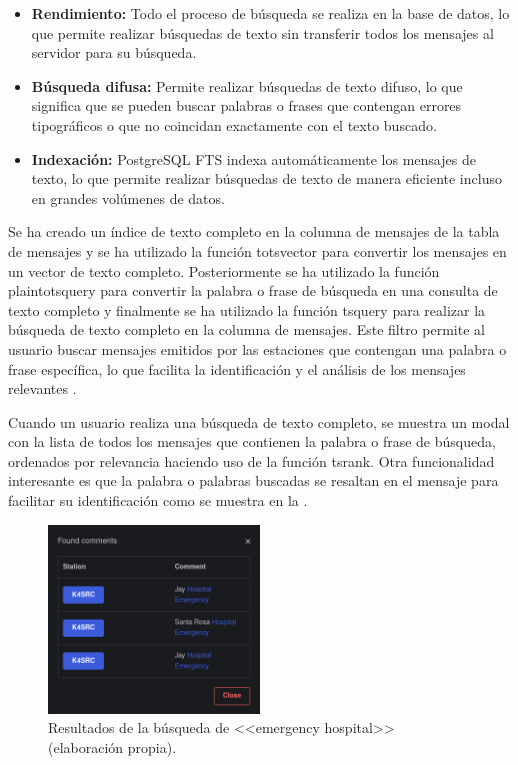 \begin{itemize}
	\item \textbf{Rendimiento:} Todo el proceso de búsqueda se realiza en la base de datos, lo que permite realizar búsquedas de texto sin transferir todos los mensajes al servidor para su búsqueda.
	\item \textbf{Búsqueda difusa:} Permite realizar búsquedas de texto difuso, lo que significa que se pueden buscar palabras o frases que contengan errores tipográficos o que no coincidan exactamente con el texto buscado.
	\item \textbf{Indexación:} PostgreSQL FTS indexa automáticamente los mensajes de texto, lo que permite realizar búsquedas de texto de manera eficiente incluso en grandes volúmenes de datos.
\end{itemize}

Se ha creado un índice de texto completo en la columna de mensajes de la tabla de mensajes y se ha utilizado la función to\textunderscore tsvector para convertir los mensajes en un vector de texto completo. Posteriormente se ha utilizado la función plainto\textunderscore tsquery para convertir la palabra o frase de búsqueda en una consulta de texto completo y finalmente se ha utilizado la función ts\textunderscore query para realizar la búsqueda de texto completo en la columna de mensajes. Este filtro permite al usuario buscar mensajes emitidos por las estaciones que contengan una palabra o frase específica, lo que facilita la identificación y el análisis de los mensajes relevantes \cite{PostgreSQLFTS}.

Cuando un usuario realiza una búsqueda de texto completo, se muestra un modal con la lista de todos los mensajes que contienen la palabra o frase de búsqueda, ordenados por relevancia haciendo uso de la función ts\textunderscore rank. Otra funcionalidad interesante es que la palabra o palabras buscadas se resaltan en el mensaje para facilitar su identificación como se muestra en la .

\begin{figure}[h]
	\centering
	\includegraphics[width=0.5\textwidth]{Imagenes/Chapter_4/fts_output.png}
	\caption[Resultados de la búsqueda de <<emergency hospital>>.]{Resultados de la búsqueda de <<emergency hospital>> (elaboración propia).}
	\label{fig:postgres-fts}
\end{figure}

